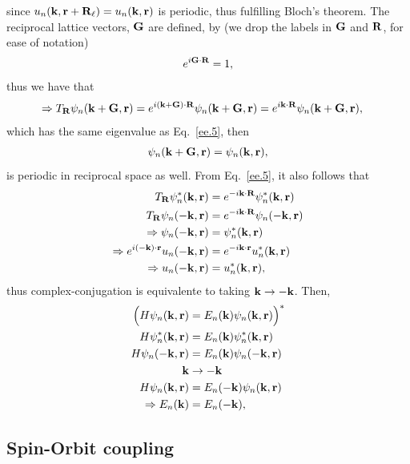 \documentclass[floatfix,prb,aps,superscriptaddress,11pt]{revtex4}
\begin{document}
since $u_n(\mathbf{k},\mathbf{r}+\mathbf{R}_\ell) =u_n(\mathbf{k},\mathbf{r}) $ is periodic, thus
fulfilling Bloch's theorem. The reciprocal lattice vectors, $\mathbf{G}$ are
defined, by (we drop the labels in $\mathbf{G}$ and $\mathbf{R}$, for ease of notation)
\begin{align}\label{ee.7}
e^{i\mathbf{G}\cdot\mathbf{R}}=1
,
\end{align} 
 thus we have that
\begin{align}\label{ee.8}
\Rightarrow T_{\mathbf{R}}\psi_n(\mathbf{k}+\mathbf{G},\mathbf{r})&= 
e^{i (\mathbf{k}+\mathbf{G})\cdot\mathbf{R}}\psi_n(\mathbf{k}+\mathbf{G},\mathbf{r}) 
= 
e^{i \mathbf{k}\cdot\mathbf{R}}\psi_n(\mathbf{k}+\mathbf{G},\mathbf{r}) 
,
\end{align}    
which has the same eigenvalue as 
Eq.~\eqref{ee.5}, then
\begin{align}\label{ee.9}
\psi_n(\mathbf{k}+\mathbf{G},\mathbf{r}) =\psi_n(\mathbf{k},\mathbf{r}) 
,
\end{align}
is periodic in reciprocal space as well. 
From Eq.~\eqref{ee.5}, it also follows that
\begin{align}\label{ee.10}
T_{\mathbf{R}}\psi^*_n(\mathbf{k},\mathbf{r})&=
e^{-i \mathbf{k}\cdot\mathbf{R}}\psi^*_n(\mathbf{k},\mathbf{r}) 
\nonumber\\ 
T_{\mathbf{R}}\psi_n(-\mathbf{k},\mathbf{r})&=
e^{-i \mathbf{k}\cdot\mathbf{R}}\psi_n(-\mathbf{k},\mathbf{r}) 
\nonumber\\
\Rightarrow \psi_n(-\mathbf{k},\mathbf{r})&=\psi^*_n(\mathbf{k},\mathbf{r})
\nonumber\\
\Rightarrow e^{i(-\mathbf{k})\cdot\mathbf{r}}u_n(-\mathbf{k},\mathbf{r}) 
&=  
e^{-i\mathbf{k}\cdot\mathbf{r}}u^*_n(\mathbf{k},\mathbf{r}) 
\nonumber\\
\Rightarrow u_n(-\mathbf{k},\mathbf{r}) 
&=  
u^*_n(\mathbf{k},\mathbf{r}) 
,
\end{align}   
thus complex-conjugation is equivalente to taking $\mathbf{k}\to
-\mathbf{k}$. Then,
 \begin{align}\label{e.n11}
\Big(
H\psi_n(\mathbf{k},\mathbf{r})&=E_n(\mathbf{k})\psi_n(\mathbf{k},\mathbf{r}) 
\Big)^*
\nonumber \\ 
H\psi^*_n(\mathbf{k},\mathbf{r})&=E_n(\mathbf{k})\psi^*_n(\mathbf{k},\mathbf{r}) 
\nonumber \\
H\psi_n(-\mathbf{k},\mathbf{r})&=E_n(\mathbf{k})\psi_n(-\mathbf{k},\mathbf{r}) 
\nonumber \\ 
\mathbf{k} &\to -\mathbf{k}
\nonumber \\  
H\psi_n(\mathbf{k},\mathbf{r})&=E_n(-\mathbf{k})\psi_n(\mathbf{k},\mathbf{r}) 
\nonumber \\ 
\Rightarrow
E_n(\mathbf{k})&=E_n(-\mathbf{k})
,
\end{align}

\subsection{Spin-Orbit coupling}
\end{document}
